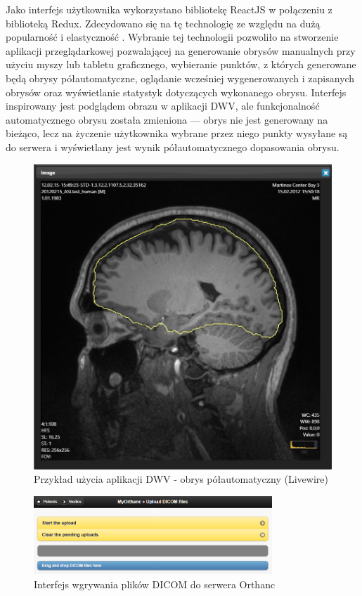 \documentclass[a4paper,11pt,twoside,openright]{report}
\theoremstyle{definition}
\begin{document}
Jako interfejs użytkownika wykorzystano bibliotekę ReactJS \cite{React} w połączeniu z biblioteką Redux. Zdecydowano się na tę technologię ze względu na dużą popularność i elastyczność \cite{Dlaczego react}. Wybranie tej technologii pozwoliło na stworzenie aplikacji przeglądarkowej pozwalającej na generowanie obrysów manualnych przy użyciu myszy lub tabletu graficznego, wybieranie punktów, z których generowane będą obrysy półautomatyczne, oglądanie wcześniej wygenerowanych i zapisanych obrysów oraz wyświetlanie statystyk dotyczących wykonanego obrysu. Interfejs inspirowany jest podglądem obrazu w aplikacji DWV, ale funkcjonalność automatycznego obrysu została zmieniona --- obrys nie jest generowany na bieżąco, lecz na życzenie użytkownika wybrane przez niego punkty wysyłane są do serwera i wyświetlany jest wynik półautomatycznego dopasowania obrysu.

\begin{figure}[t]
	\includegraphics[width=1\textwidth]{DWV-interface}
	\caption{Przykład użycia aplikacji DWV - obrys półautomatyczny (Livewire)}
    	\label{fig:DWV-interface}
\end{figure}

\begin{figure}[b]
	\center
	\includegraphics[width=0.8\textwidth]{Orthanc-upload}
	\caption{Interfejs wgrywania plików DICOM do serwera Orthanc}
    	\label{fig:Orthanc-upload}
\end{figure}
\end{document}
